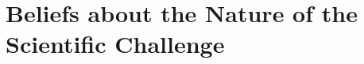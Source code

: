 \documentclass[conference,10pt]{IEEEtran}
\begin{document}
\section{Beliefs about the Nature of the Scientific Challenge}


















\end{document}
